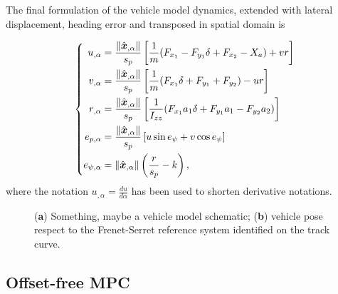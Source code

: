 \documentclass[conference]{IEEEtran} %
\renewcommand{\vec}[1]{\boldsymbol{#1}}
\DeclarePairedDelimiter{\norm}{\lVert}{\rVert}
\begin{document}
The final formulation of the vehicle model dynamics, %
extended with lateral displacement, heading error and transposed in spatial domain is

\begin{equation} \left\{
\begin{aligned}
  u_{,\alpha} &= \frac{\norm{\hat{\vec x}_{,\alpha}}}{s_p} \left[ \frac{1}{m} (F_{x_1} - F_{y_1} \delta + F_{x_2} - X_a) + vr \right] \\
  v_{,\alpha} &= \frac{\norm{\hat{\vec x}_{,\alpha}}}{s_p} \left[ \frac{1}{m} (F_{x_1} \delta + F_{y_1} + F_{y_2}) - ur \right] \\
  r_{,\alpha} &= \frac{\norm{\hat{\vec x}_{,\alpha}}}{s_p} \left[ \frac{1}{I_{zz}} (F_{x_1} a_1 \delta + F_{y_1} a_1 - F_{y_2} a_2) \right] \\
  e_{p,\alpha} &= \frac{\norm{\hat{\vec x}_{,\alpha}}}{s_p} \left[ u \sin{e_\psi} + v \cos{e_\psi} \right] \\
  e_{\psi,\alpha} &= \norm{\hat{\vec x}_{,\alpha}} \left( \frac{r}{s_p} - k \right),
\end{aligned} \right.
\label{eq:vehicle_state_update_alpha_domain}
\end{equation}
%
where the notation $u_{,\alpha} = \frac{du}{d \alpha}$ has been used to shorten derivative notations.

\begin{figure}[htb] \centering
  \quad
  \caption{(\textbf{a}) Something, maybe a vehicle model schematic; (\textbf{b}) vehicle pose respect to the Frenet-Serret reference system identified on the track curve.}
  \label{fig:scheme_frenet_serret}
\end{figure}



\subsection{Offset-free MPC}

\textcolor{gray}{\lipsum[4]}
\end{document}

